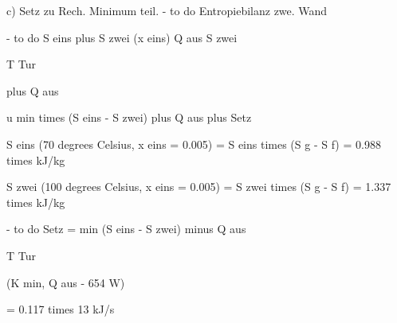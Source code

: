 c) Setz zu Rech. Minimum teil. - to do Entropiebilanz zwe. Wand

- to do S eins plus S zwei (x eins) Q aus S zwei

T Tur

plus Q aus

u min times (S eins - S zwei) plus Q aus plus Setz

S eins (70 degrees Celsius, x eins = 0.005) = S eins times (S g - S f) = 0.988 times kJ/kg

S zwei (100 degrees Celsius, x eins = 0.005) = S zwei times (S g - S f) = 1.337 times kJ/kg

- to do Setz = min (S eins - S zwei) minus Q aus

T Tur

(K min, Q aus - 654 W)

= 0.117 times 13 kJ/s